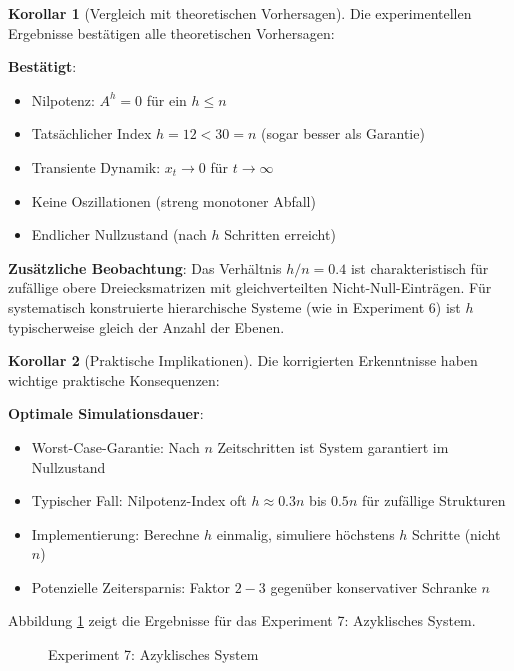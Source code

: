 \documentclass[a4paper,12pt]{report}
\theoremstyle{definition}
\newtheorem{korollar}{Korollar}
\begin{document}
	\begin{korollar}[Vergleich mit theoretischen Vorhersagen]
		Die experimentellen Ergebnisse bestätigen alle theoretischen Vorhersagen:
		
		\textbf{Bestätigt}:
		\begin{itemize}
			\item[$\checkmark$] Nilpotenz: $A^h = 0$ für ein $h \leq n$
			\item[$\checkmark$] Tatsächlicher Index $h = 12 < 30 = n$ (sogar besser als Garantie)
			\item[$\checkmark$] Transiente Dynamik: $x_t \to 0$ für $t \to \infty$
			\item[$\checkmark$] Keine Oszillationen (streng monotoner Abfall)
			\item[$\checkmark$] Endlicher Nullzustand (nach $h$ Schritten erreicht)
		\end{itemize}
		
		\textbf{Zusätzliche Beobachtung}:
		Das Verhältnis $h/n = 0.4$ ist charakteristisch für zufällige obere Dreiecksmatrizen mit gleichverteilten Nicht-Null-Einträgen. Für systematisch konstruierte hierarchische Systeme (wie in Experiment 6) ist $h$ typischerweise gleich der Anzahl der Ebenen.
	\end{korollar}
	
	\begin{korollar}[Praktische Implikationen]
		Die korrigierten Erkenntnisse haben wichtige praktische Konsequenzen:
		
		\textbf{Optimale Simulationsdauer}:
		\begin{itemize}
			\item Worst-Case-Garantie: Nach $n$ Zeitschritten ist System garantiert im Nullzustand
			\item Typischer Fall: Nilpotenz-Index oft $h \approx 0.3n$ bis $0.5n$ für zufällige Strukturen
			\item Implementierung: Berechne $h$ einmalig, simuliere höchstens $h$ Schritte (nicht $n$)
			\item Potenzielle Zeitersparnis: Faktor $2-3$ gegenüber konservativer Schranke $n$
		\end{itemize}
	\end{korollar}
	
	Abbildung \ref{fig:exp7} zeigt die Ergebnisse für das Experiment 7: Azyklisches System.
	
	\begin{figure}[H]
		\centering
		\caption{Experiment 7: Azyklisches System}
		\label{fig:exp7}
	\end{figure}
	
\end{document}
